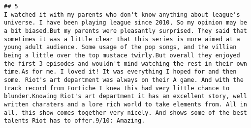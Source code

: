 \documentclass[
]{article}
\begin{document}
\begin{verbatim}
## 5                                                                                                                                                                                                                                                                                                                                                                                                                                                                                                                                                                                                                                                                                                                                                                                                                                                                                                                                                                                                                                                                                                                                                                                                                                                                                                                                                                                                                                                                                                                                                                                                                                                                                                                                                                                                                                                                                                                                                                                                                                                                                              I watched it with my parents who don't know anything about league's universe. I have been playing league since 2010, So my opinion may be a bit biased.But my parents were pleasantly surprised. They said that sometimes it was a little clear that this series is more aimed at a young adult audience. Some usage of the pop songs, and the villian being a little over the top mustace twirly.But overall they enjoyed the first 3 episodes and wouldn't mind watching the rest in their own time.As for me. I loved it! It was everything I hoped for and then some. Riot's art department was always on their A game. And with the track record from Fortiche I knew this had very little chance to blunder.Knowing Riot's art department it has an excellent story, well written charaters and a lore rich world to take elements from. All in all, this show comes together very nicely. And shows some of the best talents Riot has to offer.9/10: Amazing.

\end{verbatim}
\end{document}
